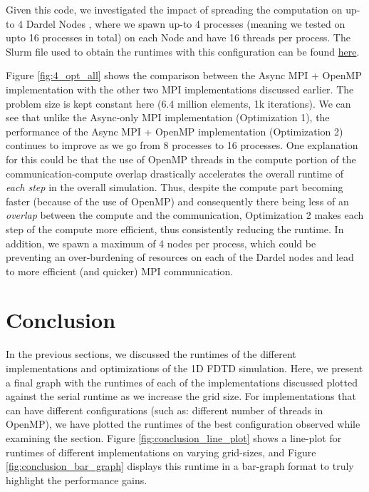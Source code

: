 \documentclass[a4paper,10pt]{article}
\begin{document}
\begin{multicols}{2}
Given this code, we investigated the impact of spreading the computation on up-to 4 Dardel Nodes , where we spawn up-to 4 processes (meaning we tested on upto 16 processes in total) on each Node and have 16 threads per process. The Slurm file used to obtain the runtimes with this configuration can be found \href{https://github.com/paulmyr/DD2356-MethodsHPC/blob/master/5_project/4_opt/run_async_omp_opt.sh}{here}. 

Figure \ref{fig:4_opt_all} shows the comparison between the Async MPI + OpenMP implementation with the other two MPI implementations discussed earlier. The problem size is kept constant here (6.4 million elements, 1k iterations). We can see that unlike the Async-only MPI implementation (Optimization 1), the performance of the Async MPI + OpenMP implementation (Optimization 2) continues to improve as we go from 8 processes to 16 processes. One explanation for this could be that the use of OpenMP threads in the compute portion of the communication-compute overlap drastically accelerates the overall runtime of \textit{each step} in the overall simulation. Thus, despite the compute part becoming faster (because of the use of OpenMP) and consequently there being less of an \textit{overlap} between the compute and the communication, Optimization 2 makes each step of the compute more efficient, thus consistently reducing the runtime. In addition, we spawn a maximum of 4 nodes per process, which could be preventing an over-burdening of resources on each of the Dardel nodes and lead to more efficient (and quicker) MPI communication.

\section{Conclusion}
In the previous sections, we discussed the runtimes of the different implementations and optimizations of the 1D FDTD simulation. Here, we present a final graph with the runtimes of each of the implementations discussed plotted against the serial runtime as we increase the grid size. For implementations that can have different configurations (such as: different number of threads in OpenMP), we have plotted the runtimes of the best configuration observed while examining the section. Figure \ref{fig:conclusion_line_plot} shows a line-plot for runtimes of different implementations on varying grid-sizes, and Figure \ref{fig:conclusion_bar_graph} displays this runtime in a bar-graph format to truly highlight the performance gains.


\end{multicols}
\end{document}
